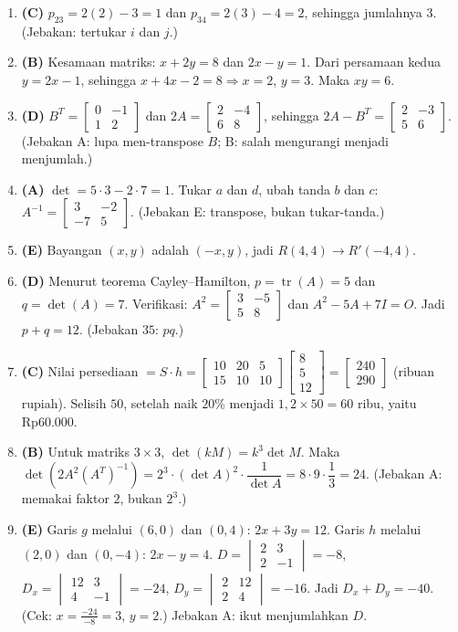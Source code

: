 \documentclass[a4paper,11pt]{article}
\newcommand{\sm}[1]{\left[\begin{smallmatrix}#1\end{smallmatrix}\right]}
\newcommand{\tr}{\operatorname{tr}}
\begin{document}
\small\begin{enumerate}[leftmargin=2em,itemsep=2pt,topsep=2pt]
\item[\textbf{1.}] \textbf{(C)} $p_{23}=2(2)-3=1$ dan $p_{34}=2(3)-4=2$, sehingga jumlahnya $3$. (Jebakan: tertukar $i$ dan $j$.)
\item[\textbf{2.}] \textbf{(B)} Kesamaan matriks: $x+2y=8$ dan $2x-y=1$. Dari persamaan kedua $y=2x-1$, sehingga $x+4x-2=8\Rightarrow x=2$, $y=3$. Maka $xy=6$.
\item[\textbf{3.}] \textbf{(D)} $B^T=\sm{0&-1\\1&2}$ dan $2A=\sm{2&-4\\6&8}$, sehingga $2A-B^T=\sm{2&-3\\5&6}$. (Jebakan A: lupa men-transpose $B$; B: salah mengurangi menjadi menjumlah.)
\item[\textbf{4.}] \textbf{(A)} $\det=5\cdot3-2\cdot7=1$. Tukar $a$ dan $d$, ubah tanda $b$ dan $c$: $A^{-1}=\sm{3&-2\\-7&5}$. (Jebakan E: transpose, bukan tukar-tanda.)
\item[\textbf{5.}] \textbf{(E)} Bayangan $(x,y)$ adalah $(-x,y)$, jadi $R(4,4)\to R'(-4,4)$.
\item[\textbf{6.}] \textbf{(D)} Menurut teorema Cayley--Hamilton, $p=\tr(A)=5$ dan $q=\det(A)=7$. Verifikasi: $A^2=\sm{3&-5\\5&8}$ dan $A^2-5A+7I=O$. Jadi $p+q=12$. (Jebakan $35$: $pq$.)
\item[\textbf{7.}] \textbf{(C)} Nilai persediaan $=S\cdot h=\begin{bmatrix}10&20&5\\15&10&10\end{bmatrix}\begin{bmatrix}8\\5\\12\end{bmatrix}=\begin{bmatrix}240\\290\end{bmatrix}$ (ribuan rupiah). Selisih $50$, setelah naik $20\%$ menjadi $1{,}2\times50=60$ ribu, yaitu Rp60.000.
\item[\textbf{8.}] \textbf{(B)} Untuk matriks $3\times3$, $\det(kM)=k^3\det M$. Maka $\det(2A^2(A^T)^{-1})=2^3\cdot(\det A)^2\cdot\dfrac1{\det A}=8\cdot9\cdot\dfrac13=24$. (Jebakan A: memakai faktor $2$, bukan $2^3$.)
\item[\textbf{9.}] \textbf{(E)} Garis $g$ melalui $(6,0)$ dan $(0,4)$: $2x+3y=12$. Garis $h$ melalui $(2,0)$ dan $(0,-4)$: $2x-y=4$. $D=\begin{vmatrix}2&3\\2&-1\end{vmatrix}=-8$, $D_x=\begin{vmatrix}12&3\\4&-1\end{vmatrix}=-24$, $D_y=\begin{vmatrix}2&12\\2&4\end{vmatrix}=-16$. Jadi $D_x+D_y=-40$. (Cek: $x=\frac{-24}{-8}=3$, $y=2$.) Jebakan A: ikut menjumlahkan $D$.

\end{enumerate}
\end{document}

